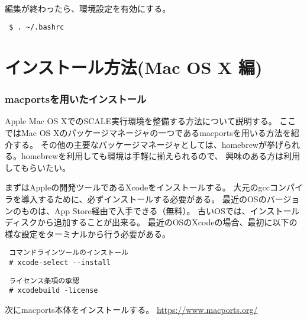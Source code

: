 \\

編集が終わったら、環境設定を有効にする。
\begin{verbatim}
 $ . ~/.bashrc
\end{verbatim}


\section{インストール方法(Mac OS X 編)}

\subsubsection{macportsを用いたインストール}

Apple Mac OS XでのSCALE実行環境を整備する方法について説明する。
ここではMac OS Xのパッケージマネージャの一つであるmacportsを用いる方法を紹介する。
その他の主要なパッケージマネージャとしては、homebrewが挙げられる。homebrewを利用しても環境は手軽に揃えられるので、
興味のある方は利用してもらいたい。

まずはAppleの開発ツールであるXcodeをインストールする。
大元のgccコンパイラを導入するために、必ずインストールする必要がある。
最近のOSのバージョンのものは、App Store経由で入手できる（無料）。
古いOSでは、インストールディスクから追加することが出来る。
最近のOSのXcodeの場合、最初に以下の様な設定をターミナルから行う必要がある。
\begin{verbatim}
 コマンドラインツールのインストール
 # xcode-select --install
\end{verbatim}
\begin{verbatim}
 ライセンス条項の承認
 # xcodebuild -license
\end{verbatim}

次にmacports本体をインストールする。
\url{https://www.macports.org/}

